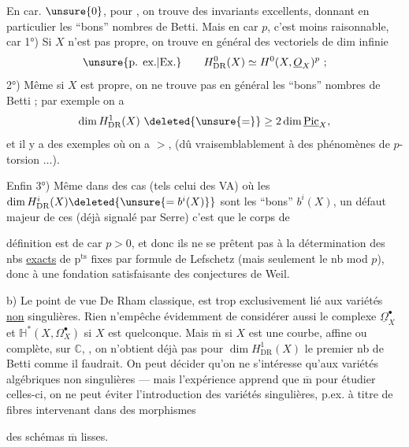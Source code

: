  En car. $\unsure{0}$, pour , on trouve des invariants excellents, donnant en particulier les ``bons'' nombres de Betti.
Mais en car $p$, c'est moins raisonnable, car
1°) Si $X$ n'est pas propre, on trouve en général des vectoriels de dim infinie
\[
\unsure{\text{p. ex.}|\text{Ex.}}\qquad H_{\mathrm{DR}}^0(X)\simeq H^0(X,\underline O_X)^p\ ;
\]
2°) Même si $X$ est propre, on ne trouve pas en général les ``bons'' nombres de Betti ; par exemple on a
\[
\dim H_{\mathrm{DR}}^1(X)\ \deleted{\unsure{=}}\geq 2\dim\underline{\mathrm{Pic}}_X,
\]
et il y a des exemples où on a $>$, (dû vraisemblablement à des phénomènes de $p$-torsion $\ldots$).

Enfin 3°) Même dans des cas (tels celui des VA) où les $\dim H_{\mathrm{DR}}^i(X)\deleted{\unsure{=b^i(X)}}$ sont les ``bons'' $b^i(X)$, un défaut majeur de ces  (déjà signalé par Serre) c'est que le corps de

définition est de car $p>0$, et donc ils ne se prêtent pas à la détermination des nbs \uline{exacts} de p$^{\mathrm{ts}}$ fixes par formule de Lefschetz (mais seulement le nb mod $p$), donc  à une fondation satisfaisante des conjectures de Weil.

b) Le point de vue De Rham classique,  est trop exclusivement lié aux variétés \uline{non} singulières. Rien n'empêche évidemment de considérer aussi le complexe $\underline\Omega_X^\bullet$ et $\mathbb H^*(X,\Omega_X^\bullet)$ si $X$ est quelconque. Mais $\overline{\mathrm m}$ si $X$ est une courbe, affine ou complète, sur $\mathbb C$,
, on n'obtient déjà pas pour  $\dim H_{\mathrm{DR}}^1(X)$ le premier nb de Betti comme il faudrait.
On peut décider qu'on ne s'intéresse qu'aux variétés algébriques non singulières — mais l'expérience apprend que $\overline{\mathrm m}$ pour étudier celles-ci, on ne peut éviter l'introduction des variétés singulières, p.ex. à titre de fibres intervenant dans des  morphismes

des schémas $\overline{\mathrm m}$ lisses. 

